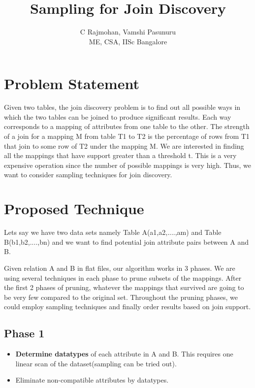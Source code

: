 \documentclass{article}
\begin{document}
\title{\Large \bf Sampling for Join Discovery}

\author{C Rajmohan, Vamshi Pasunuru\\
ME, CSA, IISc Bangalore}
\date{}

\maketitle

\section{Problem Statement}
Given two tables, the join discovery problem is to find out all possible ways in which the two tables can be joined to produce significant results. Each way corresponds to a mapping
of attributes from one table to the other. The strength of a join for a mapping M from table T1 to T2 is the percentage of rows from T1 that join to some row of T2 under the mapping M. We are interested in finding all the mappings that have support greater than a threshold t. This is a very expensive operation since the number of possible mappings is very high. Thus, we want to consider sampling techniques for join discovery.

\section{Proposed Technique}
Lets say we have two data sets namely Table A(a1,a2,....,am) and Table B(b1,b2,....,bn)
and we want to find potential join attribute pairs between A and B.

Given relation A and B in flat files, our algorithm works in 3 phases. We are using several techniques in each phase to prune subsets of the mappings. After the first 2 phases of pruning, whatever the mappings that survived are going to be very few compared to the original set. Throughout the pruning phases, we could employ sampling techniques and finally order results based on join support.

\subsection{Phase 1}

\begin{itemize}
\item \textbf{Determine datatypes} of each attribute in A and B. This requires one linear scan of the dataset(sampling can be tried out).

\item Eliminate non-compatible attributes by datatypes.
\end{itemize}
\end{document}
